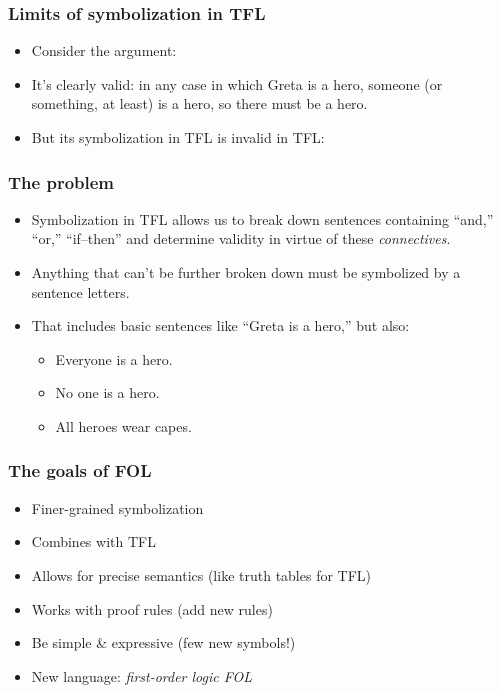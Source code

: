 \begin{frame}
  \frametitle{Limits of symbolization in TFL}

\begin{itemize}[<+->]
  \item Consider the argument:
  \item It's clearly valid: in any case in which Greta is a hero,
  someone (or something, at least) is a hero, so there must be a hero.
  \item But its symbolization in TFL is invalid in TFL:
\end{itemize}
\end{frame}

\begin{frame}
  \frametitle{The problem}

  \begin{itemize}[<+->]
    \item Symbolization in TFL allows us to break down sentences
    containing ``and,'' ``or,'' ``if--then'' and determine validity in
    virtue of these \emph{connectives}.
    \item Anything that can't be further broken down must be
    symbolized by a sentence letters.
    \item That includes basic sentences like ``Greta is a hero,'' but also:
    \begin{itemize}
      \item Everyone is a hero.
      \item No one is a hero.
      \item All heroes wear capes.
    \end{itemize}
  \end{itemize}
\end{frame}

\begin{frame}
  \frametitle{The goals of FOL}
  \begin{itemize}[<+->]
    \item Finer-grained symbolization
    \item Combines with TFL
    \item Allows for precise semantics (like truth tables for TFL)
    \item Works with proof rules (add new rules)
    \item Be simple \& expressive (few new symbols!)
    \item New language: \emph{first-order logic FOL}
  \end{itemize}
\end{frame}

